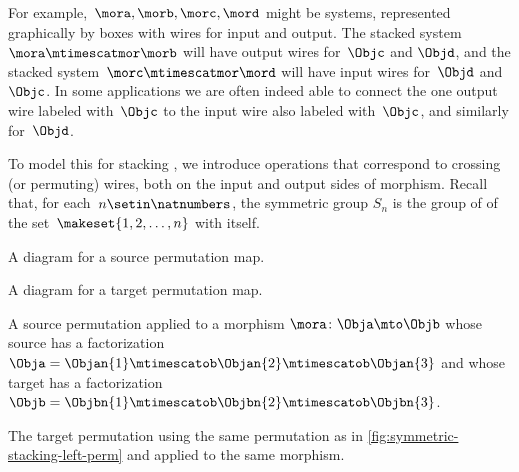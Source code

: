 For example,~$\mora, \morb, \morc, \mord$ might be systems, represented graphically by boxes with wires for input and output.
The stacked system~$\mora \mtimescatmor \morb$ will have output wires for~$\Objc$ and $\Objd$, and the stacked system~$\morc \mtimescatmor \mord$ will have input wires for~$\Objd$ and~$\Objc$.
In some applications we are often indeed able to connect the one output wire labeled with~$\Objc$ to the input wire also labeled with~$\Objc$, and similarly for~$\Objd$.

To model this for stacking , we introduce operations that correspond to crossing (or permuting) wires, both on the input and output sides of morphism.
Recall that, for each~$n \setin \natnumbers$, the symmetric group $S_n$ is the group of  of the set~$\makeset{1, 2, \ldots, n }$ with itself.

\begin{marginfigure}
    \centering
    \caption{A diagram for a source permutation map.}
    \label{fig:symmetric-stacking-left-perm}
\end{marginfigure}

\begin{marginfigure}
    \centering
    \caption{A diagram for a target permutation map.}
\end{marginfigure}

\begin{marginfigure}
    \centering
    \caption{A source permutation applied to a morphism $\mora \colon \Obja \mto \Objb$ whose source has a factorization $\Obja = \Objan{1} \mtimescatob \Objan{2}  \mtimescatob \Objan{3}$ and whose target has a factorization $\Objb = \Objbn{1} \mtimescatob \Objbn{2}  \mtimescatob \Objbn{3}$.}
    \label{fig:symmetric-stacking-left-perm-evaluated}
\end{marginfigure}

\begin{marginfigure}
    \centering
    \caption{The target permutation using the same permutation as in \cref{fig:symmetric-stacking-left-perm} and applied to the same morphism.}
    \label{fig:symmetric-stacking-target-perm}
\end{marginfigure}

